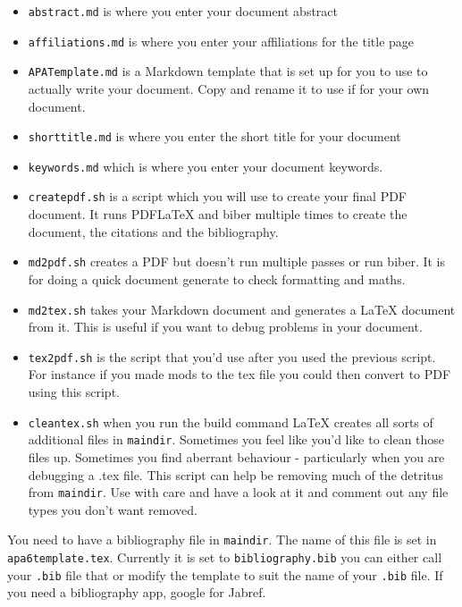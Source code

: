 \begin{itemize}
\itemsep1pt\parskip0pt
\item
  \texttt{abstract.md} is where you enter your document abstract
\item
  \texttt{affiliations.md} is where you enter your affiliations for the
  title page
\item
  \texttt{APATemplate.md} is a Markdown template that is set up for you
  to use to actually write your document. Copy and rename it to use if
  for your own document.
\item
  \texttt{shorttitle.md} is where you enter the short title for your
  document
\item
  \texttt{keywords.md} which is where you enter your document keywords.
\item
  \texttt{createpdf.sh} is a script which you will use to create your
  final PDF document. It runs PDFLaTeX and biber multiple times to
  create the document, the citations and the bibliography.
\item
  \texttt{md2pdf.sh} creates a PDF but doesn't run multiple passes or
  run biber. It is for doing a quick document generate to check
  formatting and maths.
\item
  \texttt{md2tex.sh} takes your Markdown document and generates a LaTeX
  document from it. This is useful if you want to debug problems in your
  document.
\item
  \texttt{tex2pdf.sh} is the script that you'd use after you used the
  previous script. For instance if you made mods to the tex file you
  could then convert to PDF using this script.
\item
  \texttt{cleantex.sh} when you run the build command LaTeX creates all
  sorts of additional files in \texttt{maindir}. Sometimes you feel like
  you'd like to clean those files up. Sometimes you find aberrant
  behaviour - particularly when you are debugging a .tex file. This
  script can help be removing much of the detritus from
  \texttt{maindir}. Use with care and have a look at it and comment out
  any file types you don't want removed.
\end{itemize}

You need to have a bibliography file in \texttt{maindir}. The name of
this file is set in \texttt{apa6template.tex}. Currently it is set to
\texttt{bibliography.bib} you can either call your \texttt{.bib} file
that or modify the template to suit the name of your \texttt{.bib} file.
If you need a bibliography app, google for Jabref.

